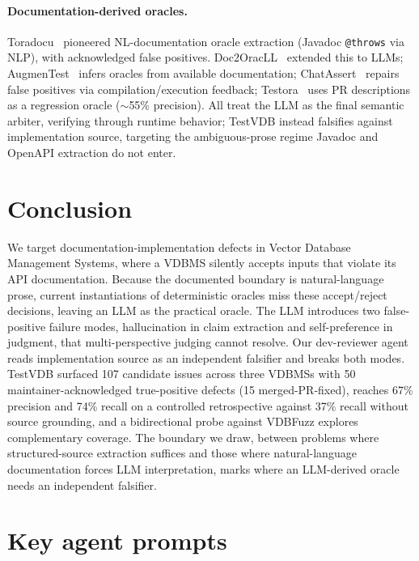 \documentclass[sigconf]{acmart}
\begin{document}
\paragraph{Documentation-derived oracles.}
Toradocu~\cite{toradocu16} pioneered NL-documentation oracle extraction (Javadoc \texttt{@throws} via NLP), with acknowledged false positives. Doc2OracLL~\cite{doc2oracll25} extended this to LLMs; AugmenTest~\cite{augmentest25} infers oracles from available documentation; ChatAssert~\cite{chatassert24} repairs false positives via compilation/execution feedback; Testora~\cite{testora26} uses PR descriptions as a regression oracle ($\sim$55\% precision). All treat the LLM as the final semantic arbiter, verifying through runtime behavior; TestVDB instead falsifies against implementation source, targeting the ambiguous-prose regime Javadoc and OpenAPI extraction do not enter.


\section{Conclusion}
\label{sec:concl}

We target documentation-implementation defects in Vector Database Management Systems, where a VDBMS silently accepts inputs that violate its API documentation. Because the documented boundary is natural-language prose, current instantiations of deterministic oracles miss these accept/reject decisions, leaving an LLM as the practical oracle. The LLM introduces two false-positive failure modes, hallucination in claim extraction and self-preference in judgment, that multi-perspective judging cannot resolve. Our dev-reviewer agent reads implementation source as an independent falsifier and breaks both modes. TestVDB surfaced 107 candidate issues across three VDBMSs with 50 maintainer-acknowledged true-positive defects (15 merged-PR-fixed), reaches 67\% precision and 74\% recall on a controlled retrospective against 37\% recall without source grounding, and a bidirectional probe against VDBFuzz explores complementary coverage. The boundary we draw, between problems where structured-source extraction suffices and those where natural-language documentation forces LLM interpretation, marks where an LLM-derived oracle needs an independent falsifier.




\appendix
\section{Key agent prompts}\label{app:prompts}
\end{document}

